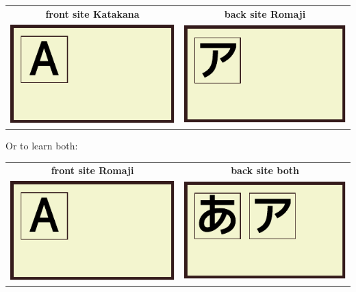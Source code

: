 \begin{center}
\begin{tabular}{cc}
\textbf{front site Katakana}&\textbf{back site Romaji}\\
\includegraphics[scale=1.5]{../share/i/fcar.pdf}%
&
\includegraphics[scale=1.5]{../share/i/fcak.pdf}%
\\
\end{tabular}
\end{center}

Or to learn both:

\begin{center}
\begin{tabular}{cc}
\textbf{front site Romaji}&\textbf{back site both}\\
\includegraphics[scale=1.5]{../share/i/fcar.pdf}%
&
\includegraphics[scale=1.5]{../share/i/fcahk.pdf}%
\\
\end{tabular}
\end{center}

